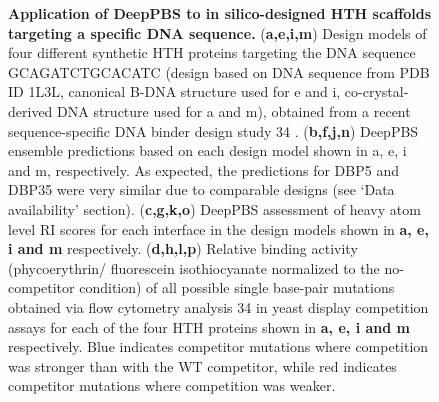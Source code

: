 \begin{center}
    \begin{figure}
        \caption[Application of DeepPBS to in silico-designed HTH scaffolds targeting a specific DNA sequence.]{\textbf{Application of DeepPBS to in silico-designed HTH scaffolds targeting a specific DNA sequence.} ({\bf a,e,i,m}) Design models of four different synthetic
HTH proteins targeting the DNA sequence GCAGATCTGCACATC (design based
on DNA sequence from PDB ID 1L3L, canonical B-DNA structure used for e and
i, co-crystal-derived DNA structure used for a and m), obtained from a recent
sequence-specific DNA binder design study 34
. ({\bf b,f,j,n}) DeepPBS ensemble
predictions based on each design model shown in a, e, i and m, respectively.
As expected, the predictions for DBP5 and DBP35 were very similar due to
comparable designs (see ‘Data availability’ section). ({\bf c,g,k,o})  DeepPBS assessment
of heavy atom level RI scores for each interface in the design models shown in
{\bf a, e, i and m} respectively. ({\bf d,h,l,p}) Relative binding activity (phycoerythrin/
fluorescein isothiocyanate normalized to the no-competitor condition) of all
possible single base-pair mutations obtained via flow cytometry analysis 34 in
yeast display competition assays for each of the four HTH proteins shown in
{\bf a, e, i and m} respectively. Blue indicates competitor mutations where
competition was stronger than with the WT competitor, while red indicates
competitor mutations where competition was weaker.}
  \label{fig:pdna5}
\end{figure}
\end{center}
